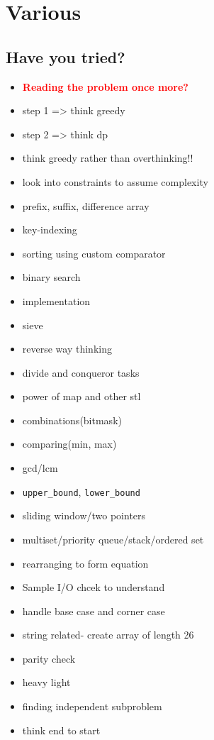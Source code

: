 \chapter{Various}

\section{Have you tried?}

\begin{itemize}
    \item \textcolor{red}{\textbf{Reading the problem once more?}}
   \item step 1 => think greedy
    \item step 2 => think dp
    \item think greedy rather than overthinking!!
    \item look into constraints to assume complexity
    \item prefix, suffix, difference array
    \item key-indexing
    \item sorting using custom comparator
    \item binary search
    \item implementation
    \item sieve
    \item reverse way thinking
    \item divide and conqueror tasks
    \item power of map and other stl
    \item combinations(bitmask)
    \item comparing(min, max)
    \item gcd/lcm
    \item \texttt{upper\_bound}, \texttt{lower\_bound}
    \item sliding window/two pointers
    \item multiset/priority queue/stack/ordered set
    \item rearranging to form equation
    \item Sample I/O chcek to understand
    \item handle base case and corner case
    \item string related- create array of length 26
    \item parity check
    \item heavy light
    \item finding independent subproblem
    \item think end to start

\end{itemize}
